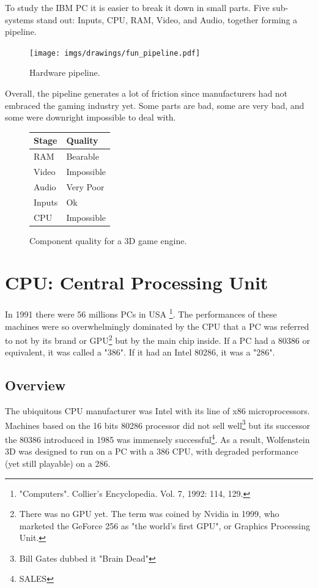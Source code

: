 \documentclass[book.tex]{subfiles}
\begin{document}
To study the IBM PC it is easier to break it down in small parts. Five sub-systems stand out: Inputs, CPU, RAM, Video, and Audio, together forming a pipeline.\\
\begin{figure}[H]
\centering
\texttt{[image: imgs/drawings/fun\_pipeline.pdf]}
\caption{Hardware pipeline.}
\label{fig:digraph}
\end{figure}

Overall, the pipeline generates a lot of friction since manufacturers had not embraced the gaming industry yet. Some parts are bad, some are very bad, and some were downright impossible to deal with.\\
\par

\begin{figure}[H]
\centering
\begin{tabularx}{\textwidth}{ X X  }
  \toprule
  \textbf{Stage} & \textbf{Quality} \\ \bottomrule
  RAM & Bearable \\ 
  Video & Impossible \\ 
  Audio & Very Poor \\ 
  Inputs & Ok \\ 
  CPU & Impossible \\ \bottomrule
\end{tabularx}
\caption{Component quality for a 3D game engine.}
\end{figure}



\section{CPU: Central Processing Unit}
  
  In 1991 there were 56 millions PCs in USA \footnote{"Computers". Collier's Encyclopedia. Vol. 7, 1992: 114, 129.}. The performances of these machines were so overwhelmingly dominated by the CPU that a PC was referred to not by its brand or GPU\footnote{There was no GPU yet. The term was coined by Nvidia in 1999, who marketed the GeForce 256 as "the world's first GPU", or Graphics Processing Unit.} but by the main chip inside. If a PC had a 80386 or equivalent, it was called a "386". If it had an Intel 80286, it was a "286".\\
\subsection{Overview}
  The ubiquitous CPU manufacturer was Intel with its line of x86 microprocessors. Machines based on the 16 bits 80286 processor did not sell well\footnote{Bill Gates dubbed it "Brain Dead"} but its successor the 80386 introduced in 1985 was immensely successful\footnote{SALES}. As a result, Wolfenstein 3D was designed to run on a PC with a 386 CPU, with degraded performance (yet still playable) on a 286.\\
\par
\end{document}

